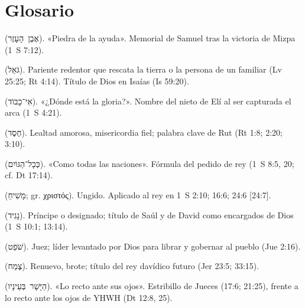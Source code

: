\documentclass[11pt,letterpaper]{article}
\newcommand{\heb}[1]{\mbox{\foreignlanguage{hebrew}{#1}}}
\newcommand{\grc}[1]{\foreignlanguage{ancientgreek}{#1}}
\begin{document}
\section*{Glosario}
\begin{description}\small
\item[Eben-ezer] (\heb{אֶבֶן הָעָזֶר}). «Piedra de la ayuda». Memorial de Samuel tras la victoria de Mizpa (1~S 7:12).
\item[Go'el] (\heb{גֹּאֵל}). Pariente redentor que rescata la tierra o la persona de un familiar (Lv 25:25; Rt 4:14). Título de Dios en Isaías (Is 59:20).
\item[Icabod] (\heb{אִי־כָבוֹד}). «¿Dónde está la gloria?». Nombre del nieto de Elí al ser capturada el arca (1~S 4:21).
\item[Jésed] (\heb{חֶסֶד}). Lealtad amorosa, misericordia fiel; palabra clave de Rut (Rt 1:8; 2:20; 3:10).
\item[Kejol ha-goyim] (\heb{כְּכָל־הַגּוֹיִם}). «Como todas las naciones». Fórmula del pedido de rey (1~S 8:5, 20; cf. Dt 17:14).
\item[Mashíaj] (\heb{מָשִׁיחַ}; gr. \grc{χριστός}). Ungido. Aplicado al rey en 1~S 2:10; 16:6; 24:6 [24:7].
\item[Naguid] (\heb{נָגִיד}). Príncipe o designado; título de Saúl y de David como encargados de Dios (1~S 10:1; 13:14).
\item[Shofet] (\heb{שֹׁפֵט}). Juez; líder levantado por Dios para librar y gobernar al pueblo (Jue 2:16).
\item[Tsémaj] (\heb{צֶמַח}). Renuevo, brote; título del rey davídico futuro (Jer 23:5; 33:15).
\item[Yashar be-einav] (\heb{הַיָּשָׁר בְּעֵינָיו}). «Lo recto ante sus ojos». Estribillo de Jueces (17:6; 21:25), frente a lo recto ante los ojos de YHWH (Dt 12:8, 25).
\end{description}
\end{document}
